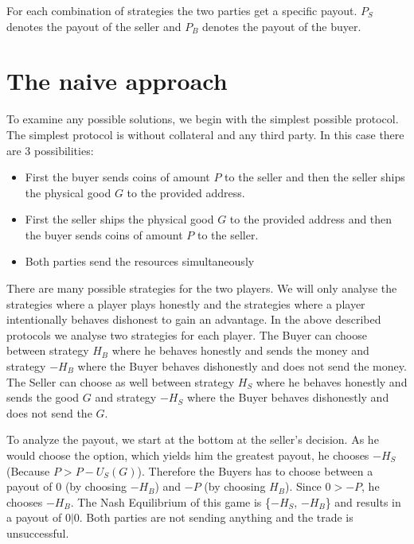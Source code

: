 \documentclass{cacthesis}
\begin{document}
For each combination of strategies the two parties get a specific payout. $P_S$ denotes the payout of the seller and $P_B$ denotes the payout of the buyer.
\section{The naive approach}
To examine any possible solutions, we begin with the simplest possible protocol.\newline
The simplest protocol is without collateral and any third party. In this case there are 3 possibilities:
\begin{itemize}
	\item First the buyer sends coins of amount $P$ to the seller and then the seller ships the physical good $G$ to the provided address. 
	\item First the seller ships the physical good $G$ to the provided address and then the buyer sends coins of amount $P$ to the seller. 
	\item Both parties send the resources simultaneously
\end{itemize}


There are many possible strategies for the two players. We will only analyse the strategies where a player plays honestly and the strategies where a player intentionally behaves dishonest to gain an advantage.\newline
In the above described protocols we analyse two strategies for each player. The Buyer can choose between strategy $H_B$ where he behaves honestly and sends the money and strategy $-H_B$ where the Buyer behaves dishonestly and does not send the money. The Seller can choose as well between strategy $H_S$ where he behaves honestly and sends the good $G$ and strategy $-H_S$ where the Buyer behaves dishonestly and does not send the $G$.
\newline
To analyze the payout, we start at the bottom at the seller's decision. As he would choose the option, which yields him the greatest payout, he chooses $-H_S$ (Because $P > P - U_S(G)$).\newline
Therefore the Buyers has to choose between a payout of 0 (by choosing $-H_B$) and $-P$ (by choosing $H_B$). Since $0 > -P$, he chooses $-H_B$.\newline
The Nash Equilibrium of this game is \{$-H_S$, $-H_B$\} and results in a payout of $0|0$. Both parties are not sending anything and the trade is unsuccessful.
\end{document}
